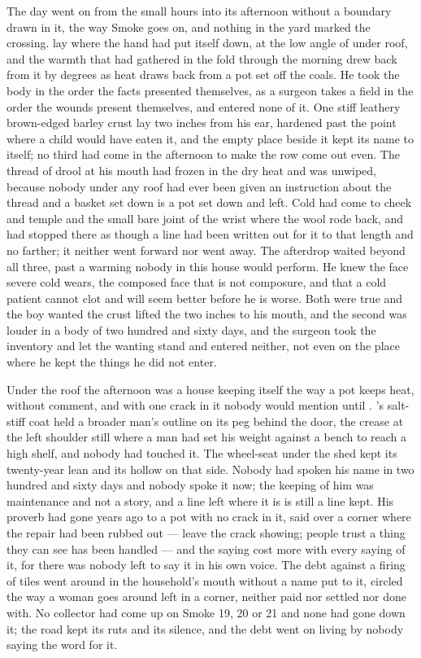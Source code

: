The day went on from the small hours into its afternoon without a boundary drawn in it, the way Smoke goes on, and nothing in the yard marked the crossing.  lay where the hand had put itself down, at the low angle of  under  roof, and the warmth that had gathered in the fold through the morning drew back from it by degrees as heat draws back from a pot set off the coals. He took the body in the order the facts presented themselves, as a surgeon takes a field in the order the wounds present themselves, and entered none of it. One stiff leathery brown-edged barley crust lay two inches from his ear, hardened past the point where a child would have eaten it, and the empty place beside it kept its name to itself; no third had come in the afternoon to make the row come out even. The thread of drool at his mouth had frozen in the dry heat and was unwiped, because nobody under any roof had ever been given an instruction about the thread and a basket set down is a pot set down and left. Cold had come to cheek and temple and the small bare joint of the wrist where the wool rode back, and had stopped there as though a line had been written out for it to that length and no farther; it neither went forward nor went away. The afterdrop waited beyond all three, past a warming nobody in this house would perform. He knew the face severe cold wears, the composed face that is not composure, and that a cold patient cannot clot and will seem better before he is worse. Both were true and the boy wanted the crust lifted the two inches to his mouth, and the second was louder in a body of two hundred and sixty days, and the surgeon took the inventory and let the wanting stand and entered neither, not even on the place where he kept the things he did not enter.

Under the roof the afternoon was a house keeping itself the way a pot keeps heat, without comment, and with one crack in it nobody would mention until . 's salt-stiff coat held a broader man's outline on its peg behind the door, the crease at the left shoulder still where a man had set his weight against a bench to reach a high shelf, and nobody had touched it. The wheel-seat under the shed kept its twenty-year lean and its hollow on that side. Nobody had spoken his name in two hundred and sixty days and nobody spoke it now; the keeping of him was maintenance and not a story, and a line left where it is is still a line kept. His proverb had gone years ago to a pot with no crack in it, said over a corner where the repair had been rubbed out --- leave the crack showing; people trust a thing they can see has been handled --- and the saying cost more with every saying of it, for there was nobody left to say it in his own voice. The debt against a firing of tiles went around in the household's mouth without a name put to it, circled the way a woman goes around  left in a corner, neither paid nor settled nor done with. No collector had come up  on Smoke 19, 20 or 21 and none had gone down it; the road kept its ruts and its silence, and the debt went on living by nobody saying the word for it.

